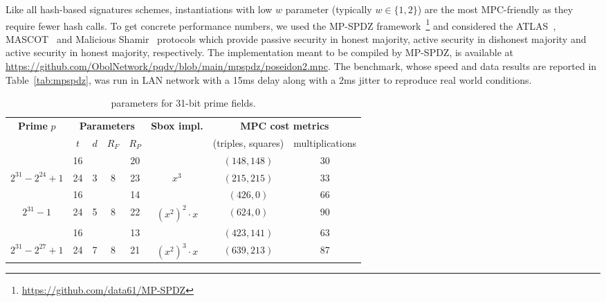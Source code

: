 Like all hash-based signatures schemes, instantiations with low $w$ parameter (typically $w \in \{1,2\}$) are the most MPC-friendly as they require fewer hash calls.
To get concrete performance numbers, we used the MP-SPDZ framework~\cite{mp-spdz}\footnote{\url{https://github.com/data61/MP-SPDZ}} and considered the ATLAS~\cite{atlas2021}, MASCOT~\cite{mascot2016} and Malicious Shamir~\cite{malshamir2017} protocols which provide passive security in honest majority, active security in dishonest majority and active security in honest majority, respectively.
The \PoseidonTwoPi implementation meant to be compiled by MP-SPDZ, is available at \url{https://github.com/ObolNetwork/pqdv/blob/main/mpspdz/poseidon2.mpc}.
The benchmark, whose speed and data results are reported in Table~\ref{tab:mpspdz}, was run in LAN network with a 15ms delay along with a 2ms jitter to reproduce real world conditions.

\renewcommand\arraystretch{1.25}
\begin{table}[t]
	\centering
	\begin{tabular}{cccccccc}
		\toprule
    		\textbf{Prime} $p$ & \multicolumn{4}{c}{\textbf{Parameters}} & \textbf{Sbox impl.} & \multicolumn{2}{c}{\textbf{MPC cost metrics}}\\
    		 & {$t$} & {$d$} & {$R_F$} & {$R_P$} & & (triples, squares) & multiplications\\
    		\midrule
   
    		& 16 &  & & 20 &  & $(148, 148)$ & 30 \\
    		\multirow{-2}{*}{$2^{31}-2^{24}+1$} & 24 & \multirow{-2}{*}{3} & \multirow{-2}{*}{8} & 23 &  \multirow{-2}{*}{$x^3$} & $(215, 215)$ & 33\\
    		\midrule
    		& 16 &  &  & 14 & & $(426, 0)$ & 66 \\
    		\multirow{-2}{*}{$2^{31}-1$} & 24 & \multirow{-2}{*}{5} & \multirow{-2}{*}{8} & 22 &  \multirow{-2}{*}{$(x^2)^2 \cdot x$} & $(624, 0)$ & 90\\
    		\midrule
    		& 16 & & & 13 &  & $(423, 141)$ & 63\\
    		\multirow{-2}{*}{$2^{31}-2^{27} + 1$}  & 24  & \multirow{-2}{*}{7} & \multirow{-2}{*}{8} & 21 &  \multirow{-2}{*}{$(x^2)^3 \cdot x$ }  & $(639, 213)$  & 87\\
    		\bottomrule
	\end{tabular}
	\caption{\PoseidonTwoPi parameters for 31-bit prime fields.\label{tab:poseidon2_inst31}}
\end{table}

